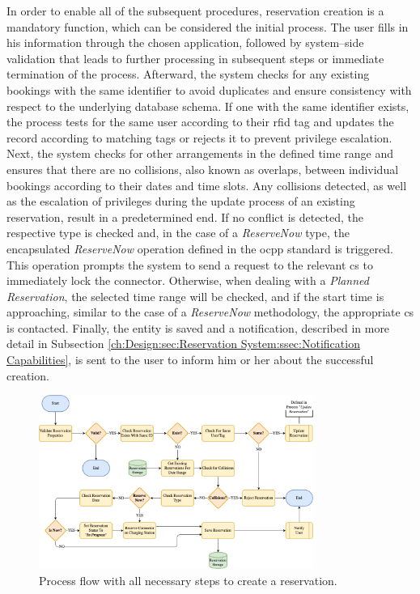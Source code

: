 In order to enable all of the subsequent procedures, reservation creation is a mandatory function, which can be considered the initial process. The user fills in his information through the chosen application, followed by system--side validation that leads to further processing in subsequent steps or immediate termination of the process.
Afterward, the system checks for any existing bookings with the same identifier to avoid duplicates and ensure consistency with respect to the underlying database schema. If one with the same identifier exists, the process tests for the same user according to their \acrshort{rfid} tag and updates the record according to matching tags or rejects it to prevent privilege escalation.
Next, the system checks for other arrangements in the defined time range and ensures that there are no collisions, also known as overlaps, between individual bookings according to their dates and time slots.
Any collisions detected, as well as the escalation of privileges during the update process of an existing reservation, result in a predetermined end.
If no conflict is detected, the respective type is checked and, in the case of a \textit{ReserveNow} type, the encapsulated \textit{ReserveNow} operation defined in the \acrshort{ocpp} standard \cite{noauthor_ocpp_nodate} is triggered. This operation prompts the system to send a request to the relevant \acrshort{cs} to immediately lock the connector. 
Otherwise, when dealing with a \textit{Planned Reservation}, the selected time range will be checked, and if the start time is approaching, similar to the case of a \textit{ReserveNow} methodology, the appropriate \acrshort{cs} is contacted.
Finally, the entity is saved and a notification, described in more detail in Subsection \ref{ch:Design:sec:Reservation System:ssec:Notification Capabilities}, is sent to the user to inform him or her about the successful creation.

\begin{figure}[h]
    \centering
    \includegraphics[width=0.8\textwidth,keepaspectratio]{resources/images/main/5_design/processes/ReservationCreate.png}
    \caption{Process flow with all necessary steps to create a reservation.}
    \label{fig:create-reservation-flowchart}
\end{figure}

